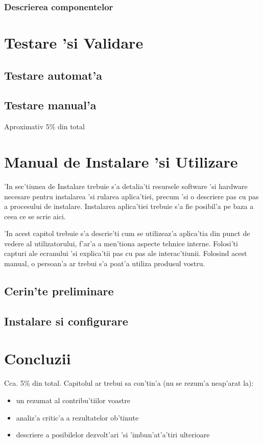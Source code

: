 \documentclass[12pt,a4paper,twoside]{report}
\begin{document}
\subsection{Descrierea componentelor}

\chapter{Testare 'si Validare}

\section{Testare automat'a}

\section{Testare manual'a}

Aproximativ 5\% din total

\chapter{Manual de Instalare 'si Utilizare}

'In sec'tiunea de Instalare trebuie s'a detalia'ti resursele software 'si hardware necesare pentru instalarea 'si rularea aplica'tiei, precum 'si o descriere pas cu pas a procesului de instalare. 
Instalarea aplica'tiei trebuie s'a fie posibil'a pe baza a ceea ce se scrie aici.

'In acest capitol trebuie s'a descrie'ti cum se utilizeaz'a aplica'tia din punct de vedere al utilizatorului, f'ar'a a men'tiona aspecte tehnice interne.
Folosi'ti capturi ale ecranului 'si explica'tii pas cu pas ale interac'tiunii. 
Folosind acest manual, o persoan'a ar trebui s'a poat'a utiliza produsul vostru.

\section{Cerin'te preliminare}
\section{Instalare si configurare}

\chapter{Concluzii}

Cca. 5\% din total.
Capitolul ar trebui sa con'tin'a (nu se rezum'a neap'arat la):
\begin{itemize}
 \item un rezumat al contribu'tiilor voastre
\item analiz'a critic'a a rezultatelor ob'tinute
\item descriere a posibilelor dezvolt'ari 'si 'imbun'at'a'tiri ulterioare
\end{itemize}
\end{document}
